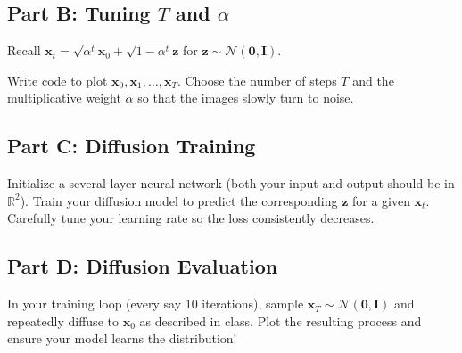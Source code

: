 \documentclass{article}
\begin{document}
\subsection*{Part B: Tuning $T$ and $\alpha$}

Recall $\mathbf{x}_t = \sqrt{\alpha^t} \mathbf{x}_0 + \sqrt{1- \alpha^t} \mathbf{z}$ for $\mathbf{z} \sim \mathcal{N}(\mathbf{0}, \mathbf{I})$.

Write code to plot $\mathbf{x}_0, \mathbf{x}_1, \ldots, \mathbf{x}_T$. Choose the number of steps $T$ and the multiplicative weight $\alpha$ so that the images slowly turn to noise.

\subsection*{Part C: Diffusion Training}

Initialize a several layer neural network (both your input and output should be in $\mathbb{R}^2$).
Train your diffusion model to predict the corresponding $\mathbf{z}$ for a given $\mathbf{x}_t$.
Carefully tune your learning rate so the loss consistently decreases.

\subsection*{Part D: Diffusion Evaluation}

In your training loop (every say 10 iterations), sample $\mathbf{x}_T \sim \mathcal{N}(\mathbf{0}, \mathbf{I})$ and repeatedly diffuse to $\mathbf{x}_0$ as described in class. Plot the resulting process and ensure your model learns the distribution!

%
\end{document}
